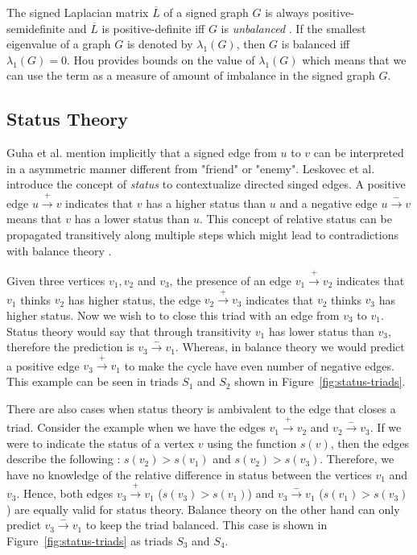 The signed Laplacian matrix $\overline{L}$ of a signed graph $G$ is always positive-semidefinite and $\overline{L}$ is positive-definite iff $G$ is \textit{unbalanced} \cite{kunegis2010spectral,hou2005bounds,zaslavsky1982signed}. If the smallest eigenvalue of a graph $G$ is denoted by $\lambda_{1}(G)$, then $G$ is balanced iff $\lambda_{1}(G)=0$. Hou \cite{hou2005bounds} provides bounds on the value of $\lambda_{1}(G)$ which means that we can use the term as a measure of amount of imbalance in the signed graph $G$.

\subsection{Status Theory}
\label{sec:status-theory}
Guha et al. \cite{guha2004propagation} mention implicitly that a signed edge from $u$ to $v$ can be interpreted in a asymmetric manner different from "friend" or "enemy". Leskovec et al. \cite{leskovec2010signed,leskovec2010predicting} introduce the concept of \textit{status} to contextualize directed singed edges. A positive edge $u \xrightarrow{+} v$ indicates that $v$ has a higher status than $u$ and a negative edge $u \xrightarrow{-} v$ means that $v$ has a lower status than $u$. This concept of relative status can be propagated transitively along multiple steps which might lead to contradictions with balance theory \cite{leskovec2010signed}.

Given three vertices $v_1,v_2$ and $v_3$, the presence of an edge $v_1 \xrightarrow{+} v_2$ indicates that $v_1$ thinks $v_2$ has higher status, the edge $v_2 \xrightarrow{+} v_3$ indicates that $v_2$ thinks $v_3$ has higher status. Now we wish to to close this triad with an edge from $v_3$ to $v_1$. Status theory would say that through transitivity $v_1$ has lower status than $v_3$, therefore the prediction is $v_3 \xrightarrow{-} v_1$. Whereas, in balance theory we would predict a positive edge $v_3 \xrightarrow{+} v_1$ to make the cycle have even number of negative edges. This example can be seen in triads $S_1$ and $S_2$ shown in Figure~\ref{fig:status-triads}.

There are also cases when status theory is ambivalent to the edge that closes a triad. Consider the example when we have the edges $v_1 \xrightarrow{+} v_2$ and $v_2 \xrightarrow{-} v_3$. If we were to indicate the status of a vertex $v$ using the function $s(v)$, then the edges describe the following : $s(v_2)>s(v_1) $ and $s(v_2)>s(v_3)$. Therefore, we have no knowledge of the relative difference in status between the vertices $v_1$ and $v_3$. Hence, both edges $v_3 \xrightarrow{+} v_1$ ($s(v_3) > s(v_1)$) and $v_3 \xrightarrow{-} v_1$ ($s(v_1) > s(v_3)$) are equally valid for status theory. Balance theory on the other hand can only predict $v_3 \xrightarrow{-} v_1$ to keep the triad balanced. This case is shown in Figure~\ref{fig:status-triads} as triads $S_3$ and $S_4$.

